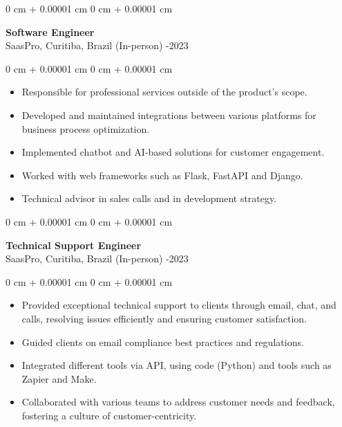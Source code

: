\documentclass[10pt, letterpaper]{article}
\newenvironment{highlights}{
    \begin{itemize}[
        topsep=0.10 cm,
        parsep=0.10 cm,
        partopsep=0pt,
        itemsep=0pt,
        leftmargin=0 cm + 10pt
    ]
}{
    \end{itemize}
}
\newenvironment{onecolentry}{
    \begin{adjustwidth}{
        0 cm + 0.00001 cm
    }{
        0 cm + 0.00001 cm
    }
}{
    \end{adjustwidth}
}
\begin{document}
\vspace{0.2cm}

\begin{onecolentry}
    \setcolumnwidth{\fill, 4.5cm}
    \begin{paracol}{2}
        \textbf{Software Engineer} \\ SaasPro, Curitiba, Brazil (In-person)
        \switchcolumn
        -2023
    \end{paracol}
\end{onecolentry}
\vspace{0.10cm}
\begin{onecolentry}
    \begin{highlights}
                \item Responsible for professional services outside of the product's scope.
                \item Developed and maintained integrations between various platforms for business process optimization.
                \item Implemented chatbot and AI-based solutions for customer engagement.
                \item Worked with web frameworks such as Flask, FastAPI and Django.
                \item Technical advisor in sales calls and in development strategy.
    \end{highlights}
\end{onecolentry}

\vspace{0.2cm}

\begin{onecolentry}
    \setcolumnwidth{\fill, 4.5cm}
    \begin{paracol}{2}
        \textbf{Technical Support Engineer} \\ SaasPro, Curitiba, Brazil (In-person)
        \switchcolumn
        -2023
    \end{paracol}
\end{onecolentry}
\vspace{0.10cm}
\begin{onecolentry}
    \begin{highlights}
                \item Provided exceptional technical support to clients through email, chat, and calls, resolving issues efficiently and ensuring customer satisfaction.
                \item Guided clients on email compliance best practices and regulations.
                \item Integrated different tools via API, using code (Python) and tools such as Zapier and Make.
                \item Collaborated with various teams to address customer needs and feedback, fostering a culture of customer-centricity.
    \end{highlights}
\end{onecolentry}
\end{document}
